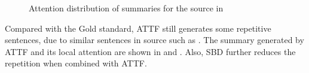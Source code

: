 \begin{figure}[th!]
\centering
{}
\quad
{}
\quad
{}
\quad
{}
\quad
{}
\quad
{}
\caption{Attention distribution of summaries for the source in }
\label{fig:attn_maps}
\end{figure}

Compared with the Gold standard,
ATTF still generates some repetitive sentences,
due to similar sentences in source
such as .
The summary generated by ATTF and its local attention are
shown in  and .
Also, SBD further reduces the repetition when combined with ATTF. 

